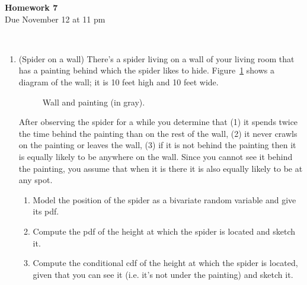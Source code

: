 \documentclass[12pt,twoside]{article}
\begin{document}
\begin{center}
{\large{\textbf{Homework 7}} } \vspace{0.2cm}\\
Due November 12 at 11 pm
\\
\end{center}
\\

\begin{enumerate}

\item (Spider on a wall) There's a spider living on a wall of your living room that has a painting behind which the spider likes to hide. Figure~\ref{fig:wall} shows a diagram of the wall; it is 10 feet high and 10 feet wide.
\begin{figure}[h]
\begin{center}
\end{center}
\caption{Wall and painting (in gray).}
\label{fig:wall}
\end{figure}

After observing the spider for a while you determine that (1) it spends twice the time behind the painting than on the rest of the wall, (2) it never crawls on the painting or leaves the wall, (3) if it is not behind the painting then it is equally likely to be anywhere on the wall. Since you cannot see it behind the painting, you assume that when it is there it is also equally likely to be at any spot.

\begin{enumerate}
\item Model the position of the spider as a bivariate random variable and give its pdf.
\item Compute the pdf of the height at which the spider is located and sketch it.
\item Compute the conditional cdf of the height at which the spider is located, given that you can see it (i.e. it's not under the painting) and sketch it. 
\end{enumerate}


\end{enumerate}
\end{document}
